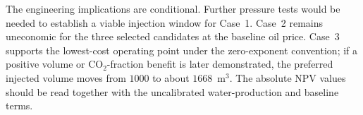 The engineering implications are conditional. Further pressure tests would be needed to establish a viable injection window
for Case~1. Case~2 remains uneconomic for the three selected candidates at
the baseline oil price. Case~3 supports the
lowest-cost operating point under the zero-exponent convention; if a positive
volume or CO$_2$-fraction benefit is later demonstrated, the preferred injected
volume moves from $1000$ to about $1668$~m$^3$. The absolute NPV values should
be read together with the uncalibrated water-production and baseline terms.
